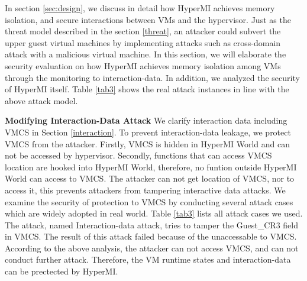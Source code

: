 \documentclass[conference]{IEEEtran}
\begin{document}

In section \ref{sec:design}, we discuss in detail how HyperMI achieves memory isolation, and secure interactions between VMs and the hypervisor. Just as the threat model described in the section \ref{threat}, an attacker could subvert the upper guest virtual machines 
by implementing attacks such as cross-domain attack with a malicious virtual machine.
In this section, we will elaborate the security evaluation on how HyperMI achieves memory isolation among VMs through the monitoring to interaction-data. 
In addition, we analyzed the security of HyperMI itself. Table \ref{tab3} shows the real attack instances in line with the above attack model. 



\textbf{Modifying Interaction-Data Attack}
We clarify interaction data including VMCS in Section \ref{interaction}.
 To prevent interaction-data leakage, we protect VMCS from the attacker. Firstly, VMCS is hidden in HyperMI World and can not be accessed by hypervisor. Secondly, functions that can access VMCS location are hooked into HyperMI World, therefore, no funtion outside HyperMI World can access to VMCS. The attacker can not get location of VMCS, nor to access it, this prevents attackers from tampering interactive data attacks. We examine the security of protection to VMCS by conducting several attack cases which are widely adopted in real world. Table \ref{tab3} lists all attack cases we used. The attack, named Interaction-data attack, tries to tamper the Guest\_CR3 field in VMCS. The result of this attack failed because of the unaccessable to VMCS. 
  According to the above analysis, the attacker can not access VMCS, and can not conduct further attack. Therefore, the VM runtime states and interaction-data can be prectected by HyperMI.
\end{document}
